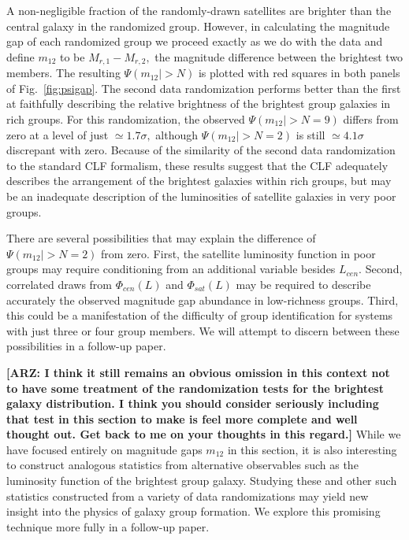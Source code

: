 \documentclass[usenatbib,usegraphicx,letterpaper]{mn2e}
\newcommand{\monetwo}{m_{12}}
\begin{document}
A non-negligible fraction of the randomly-drawn satellites are brighter than 
the central galaxy in the randomized group. However, in calculating the magnitude 
gap of each randomized group we proceed exactly as we do with the data and 
define $\monetwo$ to be $M_{r,1}-M_{r,2},$ the magnitude difference between the 
brightest two members. The resulting $\Psi(\monetwo|> N)$
is plotted with red squares in both panels of Fig.~\ref{fig:psigap}. The second data 
randomization performs better than the first at faithfully describing the relative 
brightness of the brightest group galaxies in rich groups. For this randomization, 
the observed $\Psi(\monetwo|> N=9)$ differs from zero at a level of just $\simeq 1.7\sigma,$ 
although $\Psi(\monetwo|> N=2)$ is still $\simeq 4.1\sigma$ discrepant with zero. 
Because of the similarity of the second data randomization to the standard CLF formalism, 
these results suggest that the CLF adequately describes the arrangement 
of the brightest galaxies within rich groups, but may be an inadequate description 
of the luminosities of satellite galaxies in very poor groups.

There are several possibilities that may explain the difference of 
$\Psi(\monetwo|> N=2)$ from zero. First, the satellite luminosity function 
in poor groups may require conditioning from an additional variable besides $L_{cen}.$ 
Second, correlated draws from $\Phi_{cen}(L)$ and $\Phi_{sat}(L)$ may be required to describe accurately 
the observed magnitude gap abundance in low-richness groups. 
Third, this could be a manifestation of the difficulty of group identification for systems with 
just three or four group members. We will attempt to discern between these possibilities in a follow-up paper.

{\bf [ARZ: I think it still remains an obvious omission in this context not to 
have some treatment of the randomization tests for the brightest galaxy distribution. 
I think you should consider seriously including that test in this section to make 
is feel more complete and well thought out. Get back to me on your thoughts in 
this regard.]}
While we have focused entirely on magnitude gaps $\monetwo$ in this section, 
it is also interesting to construct analogous statistics from alternative 
observables such as the luminosity function of the brightest group galaxy. 
Studying these and other such statistics constructed from a variety of data 
randomizations may yield new insight into the physics of galaxy group formation. 
We explore this promising technique more fully in a follow-up paper.
\end{document}

